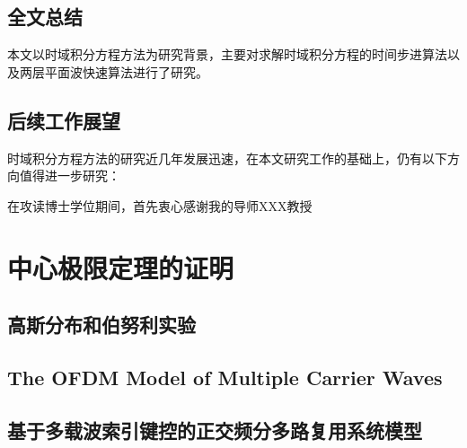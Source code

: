 \documentclass[master]{thesis-uestc}
\begin{document}
\section{全文总结}
本文以时域积分方程方法为研究背景，主要对求解时域积分方程的时间步进算法以及两层平面波快速算法进行了研究。

\section{后续工作展望}
时域积分方程方法的研究近几年发展迅速，在本文研究工作的基础上，仍有以下方向值得进一步研究：

\thesisacknowledgement
在攻读博士学位期间，首先衷心感谢我的导师XXX教授

\thesisappendix

\chapter{中心极限定理的证明}

\section{高斯分布和伯努利实验}




%
% 
%
% 
% 
%


\thesistranslationoriginal
\section{The OFDM Model of Multiple Carrier Waves}

\thesistranslationchinese
\section{基于多载波索引键控的正交频分多路复用系统模型}
\end{document}
